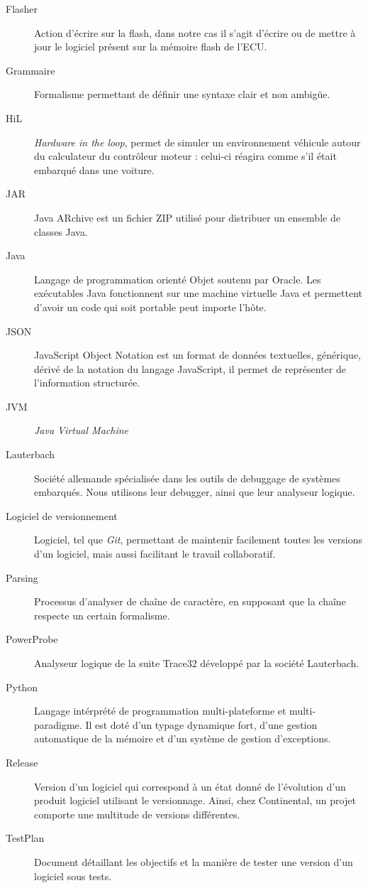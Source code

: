 \begin{description}
\item[Flasher] Action d'écrire sur la flash, dans notre cas il s'agit d'écrire ou de mettre à jour le logiciel présent sur la mémoire flash de l'ECU.
\item[Grammaire] Formalisme permettant de définir une syntaxe clair et non ambigüe.
\item[HiL] \textit{Hardware in the loop}, permet de simuler un environnement véhicule autour du calculateur du contrôleur moteur : celui-ci réagira comme s'il était embarqué dans une voiture.
\item[JAR] Java ARchive est un fichier ZIP utilisé pour distribuer un ensemble de classes Java.
\item[Java] Langage de programmation orienté Objet soutenu par Oracle. Les exécutables Java fonctionnent sur une machine virtuelle Java et permettent d'avoir un
	code qui soit portable peut importe l'hôte.
\item[JSON] JavaScript Object Notation est un format de données textuelles, générique, dérivé de la notation du langage JavaScript, il permet de représenter de
	l'information structurée.
\item[JVM] \textit{Java Virtual Machine}
\item[Lauterbach] Société allemande spécialisée dans les outils de debuggage de systèmes embarqués. Nous utilisons leur debugger, ainsi que leur analyseur logique.
\item[Logiciel de versionnement] Logiciel, tel que \textit{Git}, permettant de maintenir facilement toutes les versions d'un logiciel, mais aussi facilitant le
	travail collaboratif.
\item[Parsing] Processus d'analyser de chaîne de caractère, en supposant que la chaîne respecte un certain formalisme. 
\item[PowerProbe] Analyseur logique de la suite Trace32 développé par la société Lauterbach.
\item[Python] Langage intérprété de programmation multi-plateforme et multi-paradigme. Il est doté d'un typage dynamique fort, d'une gestion automatique de la mémoire et d'un système de gestion d'exceptions. 
\item[Release] Version d'un logiciel qui correspond à un état donné de l'évolution d'un produit logiciel utilisant le versionnage. Ainsi, chez Continental, un projet comporte une multitude de versions différentes.
\item[TestPlan] Document détaillant les objectifs et la manière de tester une version d'un logiciel sous tests.

\end{description}
